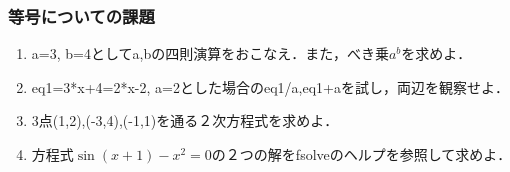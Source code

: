 \subsubsection{等号についての課題}
\begin{enumerate}
\item a=3, b=4としてa,bの四則演算をおこなえ．また，べき乗$a^b$を求めよ．
\item eq1=3*x+4=2*x-2, a=2とした場合のeq1/a,eq1+aを試し，両辺を観察せよ．
\item 3点(1,2),(-3,4),(-1,1)を通る２次方程式を求めよ．
\item 方程式$\sin(x+1)-x^2=0$の２つの解をfsolveのヘルプを参照して求めよ．
\end{enumerate}
